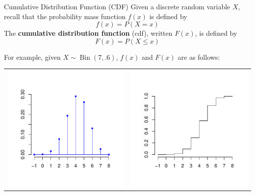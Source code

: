 \documentclass[xcolor=table]{beamer}
\DeclareMathOperator{\Bin}{Bin}
\renewcommand{\emph}{\textbf}
\begin{document}
\begin{frame}{Cumulative Distribution Function (CDF)}
Given a discrete random variable $X$, recall that the probability mass function $f(x)$ is defined by
$$f(x)=P(X=x)$$
\pause The \emph{cumulative distribution function} (cdf), written $F(x)$, is defined by
$$F(x)=P(X\leq x)$$

\pause For example, given $X\sim\Bin(7,.6)$, $f(x)$ and $F(x)$ are as follows:

\vspace{-0.5cm}
\begin{tabular}{p{4.5cm}p{4.5cm}}
\includegraphics[scale=.5]{ch3_pmf6.pdf}&
\includegraphics[scale=.5]{ch3_cdf.pdf}
\end{tabular}
\end{frame}
\end{document}
